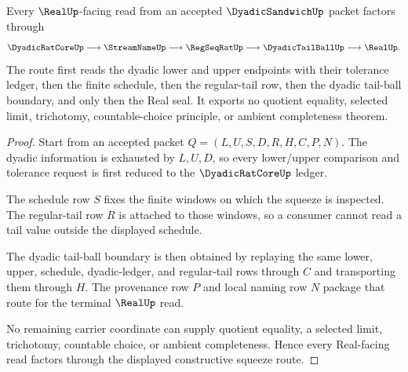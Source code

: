 \begin{theorem}
\label{thm:dyadic-sandwich-regular-cauchy-squeeze-route}
Every $\RealUp$-facing read from an accepted $\DyadicSandwichUp$ packet factors through
$$
\DyadicRatCoreUp \longrightarrow \StreamNameUp \longrightarrow \RegSeqRatUp \longrightarrow \DyadicTailBallUp \longrightarrow \RealUp .
$$
The route first reads the dyadic lower and upper endpoints with their tolerance ledger, then the finite schedule, then the regular-tail row, then the dyadic tail-ball boundary, and only then the Real seal. It exports no quotient equality, selected limit, trichotomy, countable-choice principle, or ambient completeness theorem.
\end{theorem}
\begin{proof}
Start from an accepted packet $Q=(L,U,S,D,R,H,C,P,N)$. The dyadic information is exhausted by $L,U,D$, so every lower/upper comparison and tolerance request is first reduced to the $\DyadicRatCoreUp$ ledger.

The schedule row $S$ fixes the finite windows on which the squeeze is inspected. The regular-tail row $R$ is attached to those windows, so a consumer cannot read a tail value outside the displayed schedule.

The dyadic tail-ball boundary is then obtained by replaying the same lower, upper, schedule, dyadic-ledger, and regular-tail rows through $C$ and transporting them through $H$. The provenance row $P$ and local naming row $N$ package that route for the terminal $\RealUp$ read.

No remaining carrier coordinate can supply quotient equality, a selected limit, trichotomy, countable choice, or ambient completeness. Hence every Real-facing read factors through the displayed constructive squeeze route.
\end{proof}


\begin{closurestatus}{\DyadicSandwichUp}
  \theoryclosure{\seedClosure}
  \formalstatus{\unformalizedV}
\end{closurestatus}
